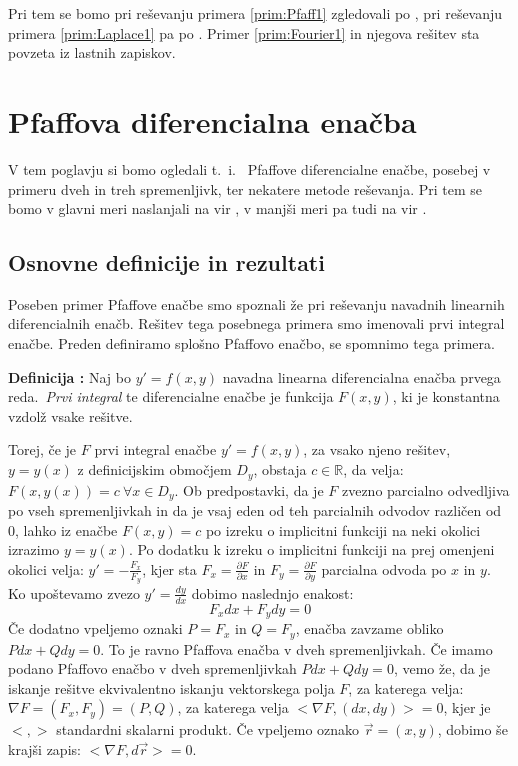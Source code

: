 \documentclass[a4paper, 10pt]{article}
\newcounter{defcount}
\newenvironment{definicija}{\begin{flushleft}\refstepcounter{defcount}\textbf{Definicija \arabic{defcount}:}}{\hfill\end{flushleft}}
\newcommand{\mth}[1]{\ensuremath{\mathbb{#1}}}
\newcommand{\R}{\mth{R}}
\newcommand{\pojem}[1]{\emph{#1}}
\begin{document}
		Pri tem se bomo pri reševanju primera \ref{prim:Pfaff1} zgledovali po \cite{bib:raman}, pri reševanju primera \ref{prim:Laplace1} pa po \cite{bib:Mag}. Primer \ref{prim:Fourier1} in njegova rešitev sta povzeta iz lastnih zapiskov.
		
	\section{Pfaffova diferencialna enačba}
		V tem poglavju si bomo ogledali t.~i.~ Pfaffove diferencialne enačbe, posebej v primeru dveh in treh spremenljivk, ter nekatere metode reševanja. Pri tem se bomo v glavni meri naslanjali na vir \cite{bib:raman}, v manjši meri pa tudi na vir \cite{bib:pfaff}.
		\subsection{Osnovne definicije in rezultati}
			Poseben primer Pfaffove enačbe smo spoznali že pri reševanju navadnih linearnih diferencialnih enačb. Rešitev tega posebnega primera smo imenovali prvi integral enačbe. Preden definiramo splošno Pfaffovo enačbo, se spomnimo tega primera.
			
			\begin{definicija}
				Naj bo $y' = f(x, y)$ navadna linearna diferencialna enačba prvega reda.~\pojem{Prvi integral} te diferencialne enačbe je funkcija $F(x, y)$, ki je konstantna vzdolž vsake rešitve.
			\end{definicija}
			Torej, če je $F$ prvi integral enačbe $y' = f(x, y)$, za vsako njeno rešitev, $y = y(x)$ z definicijskim območjem $D_y$, obstaja $c\in\R$, da velja: $F(x, y(x)) = c ~\forall x\in D_y$. Ob predpostavki, da je $F$ zvezno parcialno odvedljiva po vseh spremenljivkah in da je vsaj eden od teh parcialnih odvodov različen od $0$, lahko iz enačbe $F(x, y) = c$ po izreku o implicitni funkciji na neki okolici izrazimo $y = y(x)$. Po dodatku k izreku o implicitni funkciji na prej omenjeni okolici velja: $y' = -\frac{F_x}{F_y}$, kjer sta $F_x = \frac{\partial F}{\partial x}$ in $F_y = \frac{\partial F}{\partial y}$ parcialna odvoda po $x$ in $y$. Ko upoštevamo zvezo $y' = \frac{dy}{dx}$ dobimo naslednjo enakost: $$F_x dx + F_y dy = 0$$ Če dodatno vpeljemo oznaki $P = F_x$ in $Q = F_y$, enačba zavzame obliko $P dx + Q dy = 0$. To je ravno Pfaffova enačba v dveh spremenljivkah. Če imamo podano Pfaffovo enačbo v dveh spremenljivkah $P dx + Q dy = 0$, vemo že, da je iskanje rešitve ekvivalentno iskanju vektorskega polja $F$, za katerega velja: $\nabla F = (F_x, F_y) = (P, Q)$, za katerega velja $<\nabla F, (dx, dy)> = 0$, kjer je $<, >$ standardni skalarni produkt. Če vpeljemo oznako $\vec{r} = (x, y)$, dobimo še krajši zapis: $<\nabla F, d\vec{r}> = 0$.
			
\end{document}
